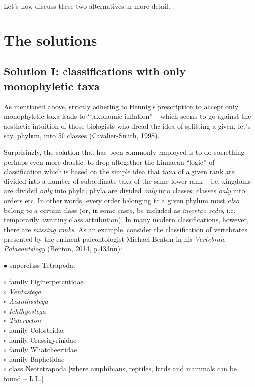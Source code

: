 \begin{artengenv}
Let’s now discuss these two alternatives in more detail.

\section{The solutions}
\vspace*{-1cm}
\subsection{Solution I: classifications with only monophyletic taxa}

As mentioned above, strictly adhering to Hennig’s prescription to accept only monophyletic taxa leads to “taxonomic
inflation” – which seems to go against the aesthetic intuition of those biologists who dread the idea of splitting a
given, let’s say, phylum, into 50 classes \label{ref:RNDsx8NDQDrK2}(Cavalier-Smith, 1998).

Surprisingly, the solution that has been commonly employed is to do something perhaps even more drastic: to drop
altogether the Linnaean “logic” of classification which is based on the simple idea that taxa of a given rank are
divided into a number of subordinate taxa of the same lower rank – i.e. kingdoms are divided \textit{only} into phyla;
phyla are divided \textit{only} into classes; classes \textit{only} into orders etc. In other words, every order
belonging to a given phylum must \textit{also }belong to a certain class (or, in some cases, be included as
\textit{incertae sedis}, i.e. temporarily awaiting class attribution). In many modern classifications, however, there
are \textit{missing ranks}. As an example, consider the classification of vertebrates presented by the eminent
paleontologist Michael Benton in his \textit{Vertebrate Palaeontology} \label{ref:RNDqnkTfPlTq8}(Benton, 2014,
p.433nn):

\noindent$\bullet$ superclass Tetrapoda:
\begin{addmargin}[1em]{0em}
 $\circ$ family Elginerpetontidae\\
 $\circ$ \textit{Ventastega}\\
 $\circ$ \textit{Acanthostega}\\
 $\circ$ \textit{Ichthyostega}\\
 $\circ$ \textit{Tulerpeton}\\
 $\circ$ family Colosteidae\\
 $\circ$ family Crassigyrinidae\\
 $\circ$ family Whatcheeriidae\\
 $\circ$ family Baphetidae\\
 $\circ$ class Neotetrapoda [where amphibians, reptiles, birds and mammals can be found – L.L.]
\end{addmargin}


\end{artengenv}
